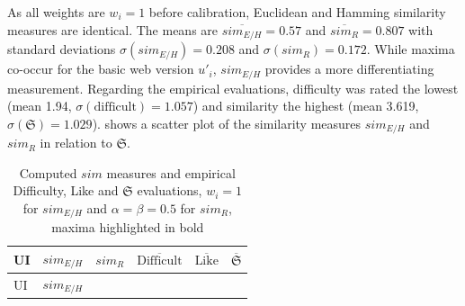 As all weights are \(w_i=1\) before calibration, Euclidean and Hamming similarity measures are identical.
The means are \(\overline{sim_{E/H}}=0.57\) and \(\overline{sim_R}=0.807\) with standard deviations \(\sigma(sim_{E/H})=0.208\) and \(\sigma(sim_R)=0.172\).
While maxima co-occur for the basic \gls{web} version \(u'_i\), \(sim_{E/H}\) provides a more differentiating measurement.
Regarding the empirical evaluations, difficulty was rated the lowest (mean 1.94, \(\sigma(\text{difficult})=1.057\)) and similarity the highest (mean 3.619, \(\sigma(\mathfrak{S})=1.029\)).
 shows a scatter plot of the similarity measures \(sim_{E/H}\) and \(sim_R\) in relation to \(\mathfrak{S}\).

\hypertarget{tbl:ci:sim}{}
\begin{longtable}[]{@{}llllll@{}}
\caption[Computed \(sim\) measures, empirical Difficulty, Like, \(\mathfrak{S}\)]{\label{tbl:ci:sim}Computed \(sim\) measures and empirical Difficulty, Like and \(\mathfrak{S}\) evaluations, \(w_i=1\) for \(sim_{E/H}\) and \(\alpha=\beta=0.5\) for \(sim_R\), maxima highlighted in bold}\tabularnewline
\toprule
\begin{minipage}[b]{0.15\columnwidth}\raggedright
UI\strut
\end{minipage} & \begin{minipage}[b]{0.08\columnwidth}\raggedright
\(sim_{E/H}\)\strut
\end{minipage} & \begin{minipage}[b]{0.07\columnwidth}\raggedright
\(sim_R\)\strut
\end{minipage} & \begin{minipage}[b]{0.20\columnwidth}\raggedright
\(\overline{\text{Difficult}}\)\strut
\end{minipage} & \begin{minipage}[b]{0.17\columnwidth}\raggedright
\(\overline{\text{Like}}\)\strut
\end{minipage} & \begin{minipage}[b]{0.17\columnwidth}\raggedright
\(\overline{\mathfrak{S}}\)\strut
\end{minipage}\tabularnewline
\midrule
\endfirsthead
\toprule
\begin{minipage}[b]{0.15\columnwidth}\raggedright
UI\strut
\end{minipage} & \begin{minipage}[b]{0.08\columnwidth}\raggedright
\(sim_{E/H}\)\strut
\end{minipage} & \begin{minipage}[b]{0.07\columnwidth}\raggedright

\end{minipage}
\end{longtable}
